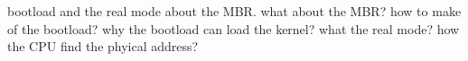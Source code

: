 

bootload and the real mode
about the MBR.
what about the MBR?
how to make of the bootload?
why the bootload can load the kernel?
what the real mode?
how the CPU find the phyical address?


